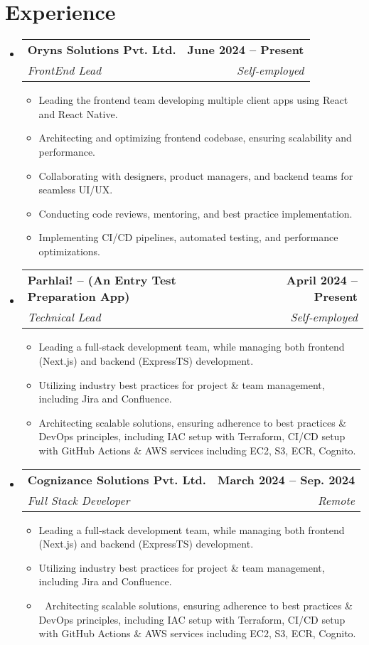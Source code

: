 \documentclass[letterpaper,11pt]{article}
\makeatletter
\newcommand{\resumeItem}[1]{
  \item\small{
    {#1 \vspace{-2pt}}
  }
}
\newcommand{\resumeSubheading}[4]{
  \vspace{-2pt}\item
    \begin{tabular*}{1.0\textwidth}[t]{l@{\extracolsep{\fill}}r}
      \textbf{#1} & \textbf{\small #2} \\
      \textit{\small#3} & \textit{\small #4} \\
    \end{tabular*}\vspace{-7pt}
}
\newcommand{\resumeSubHeadingListStart}{\begin{itemize}[leftmargin=0.0in, label={}]}
\newcommand{\resumeSubHeadingListEnd}{\end{itemize}}
\newcommand{\resumeItemListStart}{\begin{itemize}}
\newcommand{\resumeItemListEnd}{\end{itemize}\vspace{-5pt}}
\makeatother
\begin{document}
\vspace{-10pt}

\section{Experience}
  \resumeSubHeadingListStart
  \resumeSubheading
    {Oryns Solutions Pvt. Ltd.}{June 2024 -- Present}
    {FrontEnd Lead}{Self-employed}
    \resumeItemListStart
      \resumeItem{Leading the frontend team developing multiple client apps using React and React Native.}
      \resumeItem{Architecting and optimizing frontend codebase, ensuring scalability and performance.}
      \resumeItem{Collaborating with designers, product managers, and backend teams for seamless UI/UX.}
      \resumeItem{Conducting code reviews, mentoring, and best practice implementation.}
       \resumeItem{Implementing CI/CD pipelines, automated testing, and performance optimizations.}
    \resumeItemListEnd
\resumeSubheading
    {Parhlai! – (An Entry Test Preparation App)}{April 2024 -- Present}
    {Technical Lead}{Self-employed}
    \resumeItemListStart
      \resumeItem{Leading a full-stack development team, while managing both frontend (Next.js) and backend (ExpressTS) development.}
      \resumeItem{Utilizing industry best practices for project & team management, including Jira and Confluence.}
      \resumeItem{Architecting scalable solutions, ensuring adherence to best practices 
& DevOps principles, including IAC setup with Terraform, CI/CD setup
with GitHub Actions & AWS services including EC2, S3, ECR, Cognito.}
    \resumeItemListEnd

\resumeSubheading
    {Cognizance Solutions Pvt. Ltd.}{March 2024 -- Sep. 2024}
    {Full Stack Developer}{Remote}
    \resumeItemListStart
      \resumeItem{Leading a full-stack development team, while managing both frontend (Next.js) and backend (ExpressTS) development.}
      \resumeItem{Utilizing industry best practices for project & team management, including Jira and Confluence.}
      \resumeItem{	Architecting scalable solutions, ensuring adherence to best practices 
& DevOps principles, including IAC setup with Terraform, CI/CD setup
with GitHub Actions & AWS services including EC2, S3, ECR, Cognito.}
    \resumeItemListEnd
\resumeSubHeadingListEnd

\vspace{-10pt}

\end{document}
